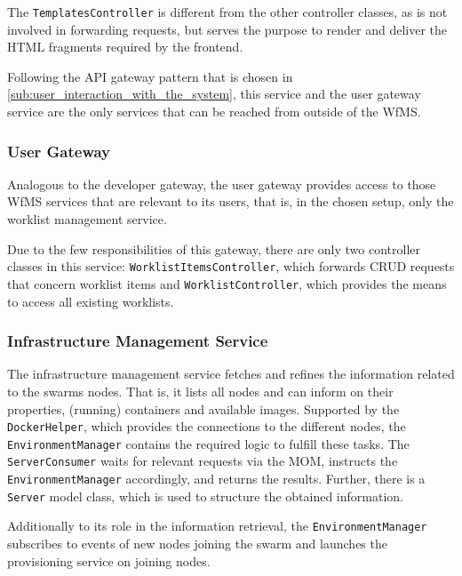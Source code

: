 
    The \texttt{TemplatesController} is different from the other controller classes, as is not involved in forwarding requests, but serves the purpose to render and deliver the \ac{HTML} fragments required by the frontend.

    Following the API gateway pattern that is chosen in \ref{sub:user_interaction_with_the_system}, this service and the user gateway service are the only services that can be reached from outside of the \ac{WfMS}.

  \subsubsection{User Gateway} %
    \label{subs:user_gateway}
    Analogous to the developer gateway, the user gateway provides access to those \ac{WfMS} services that are relevant to its users, that is, in the chosen setup, only the worklist management service.

    Due to the few responsibilities of this gateway, there are only two controller classes in this service: \texttt{WorklistItemsController}, which forwards \ac{CRUD} requests that concern worklist items and \texttt{WorklistController}, which provides the means to access all existing worklists.

  \subsubsection{Infrastructure Management Service} %
    \label{subs:environment_management_service}
    The infrastructure management service fetches and refines the information related to the swarms nodes.
    That is, it lists all nodes and can inform on their properties, (running) containers and available images.
    Supported by the \texttt{DockerHelper}, which provides the connections to the different nodes, the \texttt{EnvironmentManager} contains the required logic to fulfill these tasks. The \texttt{ServerConsumer} waits for relevant requests via the \ac{MOM}, instructs the \texttt{EnvironmentManager} accordingly, and returns the results. Further, there is a \texttt{Server} model class, which is used to structure the obtained information.

    Additionally to its role in the information retrieval, the \texttt{EnvironmentManager} subscribes to events of new nodes joining the swarm and launches the provisioning service on joining nodes.

